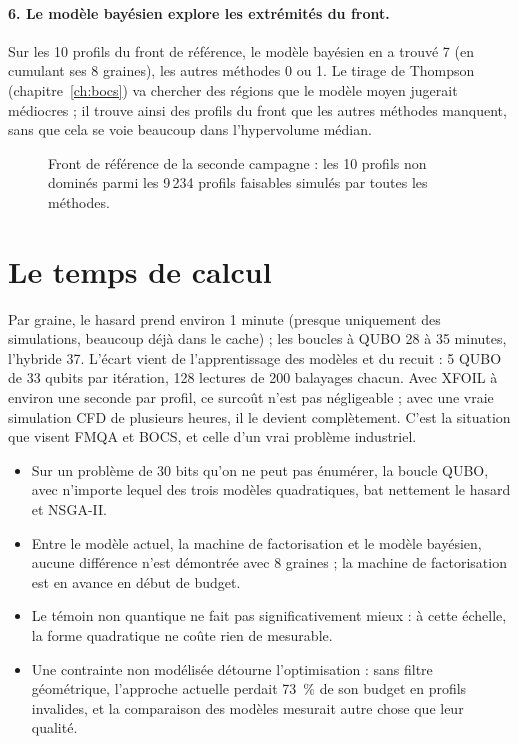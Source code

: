\paragraph{6. Le modèle bayésien explore les extrémités du front.} Sur les 10 profils du front de référence, le modèle bayésien en a trouvé 7 (en cumulant ses 8 graines), les autres méthodes 0 ou 1. Le tirage de Thompson (chapitre~\ref{ch:bocs}) va chercher des régions que le modèle moyen jugerait médiocres ; il trouve ainsi des profils du front que les autres méthodes manquent, sans que cela se voie beaucoup dans l'hypervolume médian.

\begin{figure}[htbp]
\centering

\caption{Front de référence de la seconde campagne : les 10 profils non dominés parmi les 9\,234 profils faisables simulés par toutes les méthodes.}\label{fig:echelle-front}
\end{figure}

\section{Le temps de calcul}
Par graine, le hasard prend environ 1 minute (presque uniquement des simulations, beaucoup déjà dans le cache) ; les boucles à QUBO 28 à 35 minutes, l'hybride 37. L'écart vient de l'apprentissage des modèles et du recuit : 5 QUBO de 33 qubits par itération, 128 lectures de 200 balayages chacun. Avec XFOIL à environ une seconde par profil, ce surcoût n'est pas négligeable ; avec une vraie simulation CFD de plusieurs heures, il le devient complètement. C'est la situation que visent FMQA et BOCS, et celle d'un vrai problème industriel.

\begin{resultat}
\begin{itemize}
\item Sur un problème de 30 bits qu'on ne peut pas énumérer, la boucle QUBO, avec n'importe lequel des trois modèles quadratiques, bat nettement le hasard et NSGA-II.
\item Entre le modèle actuel, la machine de factorisation et le modèle bayésien, aucune différence n'est démontrée avec 8 graines ; la machine de factorisation est en avance en début de budget.
\item Le témoin non quantique ne fait pas significativement mieux : à cette échelle, la forme quadratique ne coûte rien de mesurable.
\item Une contrainte non modélisée détourne l'optimisation : sans filtre géométrique, l'approche actuelle perdait 73~\% de son budget en profils invalides, et la comparaison des modèles mesurait autre chose que leur qualité.
\end{itemize}
\end{resultat}

